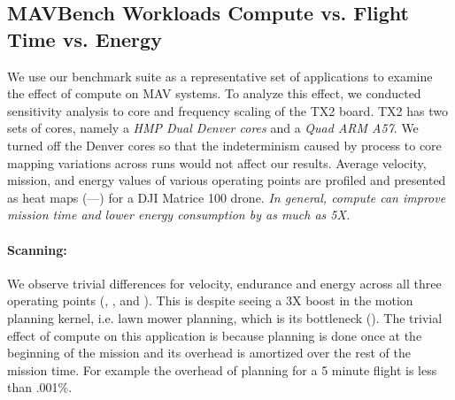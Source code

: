 \subsection{MAVBench Workloads Compute vs. Flight Time vs. Energy}
\label{sec:operating-spoints}
We use our benchmark suite as a representative set of applications to examine the effect of compute on MAV systems. To analyze this effect, we conducted sensitivity analysis to core and frequency scaling of the TX2 board. TX2 has two sets of cores, namely a \textit{HMP Dual Denver cores} and a \textit{Quad ARM A57}. We turned off the Denver cores so that the indeterminism caused by process to core mapping variations across runs would not affect our results.
Average velocity, mission, and energy values of various operating points are profiled and presented as heat maps (---) for a DJI Matrice 100 drone. \emph{In general, compute can improve mission time and lower energy consumption by as much as 5X.}

\paragraph{Scanning:}
We observe trivial differences for velocity, endurance and energy across all three operating points (, , and ). This is despite seeing a 3X boost in the motion planning kernel, i.e. lawn mower planning, which is its bottleneck (). The trivial effect of compute on this application is because planning is done once at the beginning of the mission and its overhead is amortized over the rest of the mission time. For example the overhead of planning for a 5 minute flight is less than .001\%.  





